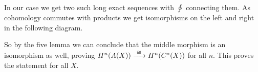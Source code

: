 {	In our case we get two such long exact sequences with $\oint$ connecting them. As cohomology commutes with products we get isomorphisms on the left and right in the following diagram.


	So by the five lemma we can conclude that the middle morphism is an isomorphism as well, proving $H^n(A(X)) \xrightarrow{\,\,{\cong}\,\,} H^n(C^\ast(X))$ for all $n$. This proves the statement for all $X$.
}


